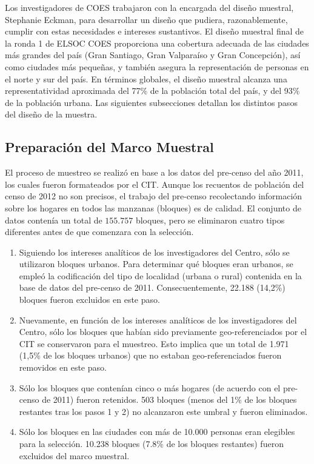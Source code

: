 \documentclass[12pt]{report}
\begin{document}
Los investigadores de COES trabajaron con la encargada del diseño muestral, Stephanie Eckman, para desarrollar un diseño que pudiera, razonablemente, cumplir con estas necesidades e intereses sustantivos. El diseño muestral final de la ronda 1 de ELSOC COES proporciona una cobertura adecuada de las ciudades más grandes del país (Gran Santiago, Gran Valparaíso y Gran Concepción), así como ciudades más pequeñas, y también asegura la representación de personas en el norte y sur del país. En términos globales, el diseño muestral alcanza una representatividad aproximada del 77\% de la población total del país, y del 93\% de la población urbana. Las siguientes subsecciones detallan los distintos pasos del diseño de la muestra.\\

\subsection*{Preparación del Marco Muestral}

El proceso de muestreo se realizó en base a los datos del pre-censo del año 2011, los cuales fueron formateados por el CIT. Aunque los recuentos de población del censo de 2012 no son precisos, el trabajo del pre-censo recolectando información sobre los hogares en todos las manzanas (bloques) es de calidad. El conjunto de datos contenía un total de $155.757$ bloques, pero se eliminaron cuatro tipos diferentes antes de que comenzara con la selección.\\
\begin{enumerate}
	\item Siguiendo los intereses analíticos de los investigadores del Centro, sólo se utilizaron bloques urbanos. Para determinar qué bloques eran urbanos, se empleó la codificación del tipo de localidad (urbana o rural) contenida en la base de datos del pre-censo de 2011. Consecuentemente, 22.188 (14,2\%) bloques fueron excluidos en este paso.
	\item Nuevamente, en función de los intereses analíticos de los investigadores del Centro, sólo los bloques que habían sido previamente geo-referenciados por el CIT se conservaron para el muestreo. Esto implica que un total de 1.971 (1,5\% de los bloques urbanos) que no estaban geo-referenciados fueron removidos en este paso.
	\item Sólo los bloques que contenían cinco o más hogares (de acuerdo con el pre-censo de 2011) fueron retenidos. 503 bloques (menos del 1\% de los bloques restantes tras los pasos 1 y 2) no alcanzaron este umbral y fueron eliminados.
	\item Sólo los bloques en las ciudades con más de 10.000 personas eran elegibles para la selección. 10.238 bloques (7.8\% de los bloques restantes) fueron excluidos del marco muestral.
\end{enumerate}
\vspace{0.5cm}
\end{document}
